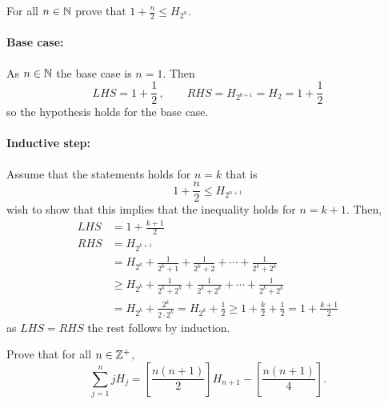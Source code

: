 \documentclass[a4paper, english, 12pt]{article} %
\begin{document}
\begin{subproblem}
  For all $n \in \mathbb{N}$ prove that $1 + \frac{n}{2} \leq H_{2^n}$.
\end{subproblem}

\begin{answer}
  \paragraph{Base case:} As $n \in \mathbb{N}$ the base case is $n=1$. Then
  \begin{equation*}
    LHS = 1 + \frac{1}{2} \,, \qquad
    RHS = H_{2^{0+1}} = H_2 = 1 + \frac{1}{2}
  \end{equation*}
  so the hypothesis holds for the base case.
  \paragraph{Inductive step:} Assume that the statements holds for $n=k$ that is
  \begin{equation*}
    1 + \frac{n}{2} \leq H_{2^{n+1}}
  \end{equation*}
  wish to show that this implies that the inequality holds for $n=k+1$. Then,
  \begin{align*}
    LHS & = 1 + \frac{k+1}{2} \\
    RHS & = H_{2^{k+1}} \\
    & = H_{2^k} + \frac{1}{2^k+1} + \frac{1}{2^k + 2} + \cdots + \frac{1}{2^k + 2^k} \\
    & \geq H_{2^k} + \frac{1}{2^k+2^k} + \frac{1}{2^k + 2^k} + \cdots + \frac{1}{2^k + 2^k} \\
    & = H_{2^k} + \frac{2^k}{2 \cdot 2^k}
      = H_{2^{k}} + \frac{1}{2}
      \geq 1 + \frac{k}{2} + \frac{1}{2} = 1 + \frac{k+1}{2}
  \end{align*}
  as $LHS = RHS$ the rest follows by induction. 
\end{answer}

\begin{subproblem}
  Prove that for all $n \in \mathbb{Z}^+$,
  \begin{equation*}
    \sum_{j=1}^n j H_j
    = \left[ \frac{n(n+1)}{2} \right] H_{n+1} - \left[ \frac{n(n+1)}{4} \right].
  \end{equation*}
\end{subproblem}
\end{document}
